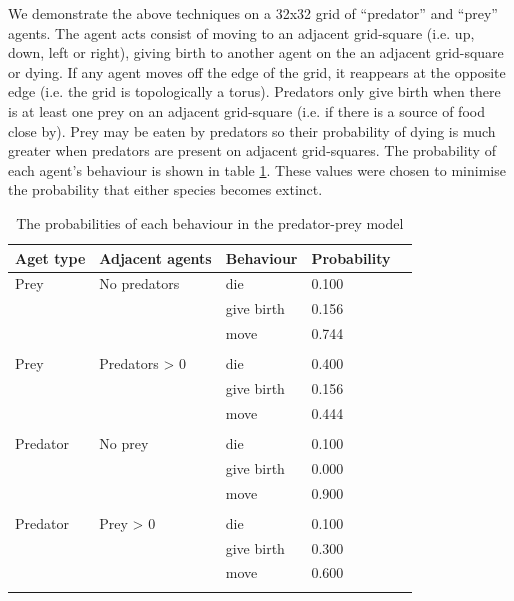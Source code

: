 \documentclass{article}
\begin{document}
We demonstrate the above techniques on a 32x32 grid of ``predator'' and ``prey'' agents. The agent acts consist of moving to an adjacent grid-square (i.e. up, down, left or right), giving birth to another agent on the an adjacent grid-square or dying. If any agent moves off the edge of the grid, it reappears at the opposite edge (i.e. the grid is topologically a torus). Predators only give birth when there is at least one prey on an adjacent grid-square (i.e. if there is a source of food close by). Prey may be eaten by predators so their probability of dying is much greater when predators are present on adjacent grid-squares. The probability of each agent's behaviour is shown in table \ref{rates}. These values were chosen to minimise the probability that either species becomes extinct.
\begin{table}
	\begin{center}
		\begin{tabular}{llllc}
		\hline
		Aget type & Adjacent agents & Behaviour & Probability\\
		\hline
		Prey & No predators & die &        0.100\\
			& & give birth &        0.156\\
			& & move &        0.744\\
			& &&\\
		Prey & Predators > 0 & die &        0.400\\
			& & give birth &        0.156\\
			& & move &        0.444\\
			& &&\\
		Predator  & No prey & die  &      0.100\\
			& & give birth &        0.000\\
			& & move &        0.900\\
			& &&\\
		Predator  & Prey > 0 & die  &      0.100\\
			& & give birth &        0.300\\
			& & move &        0.600\\
		\hline& 
		\end{tabular}
	\end{center}
	\caption{The probabilities of each behaviour in the predator-prey model}
	\label{rates}
\end{table}
\end{document}
